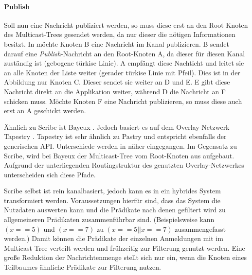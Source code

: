 \paragraph{Publish}
Soll nun eine Nachricht publiziert werden, so muss diese erst an den Root-Knoten des Multicast-Trees gesendet werden, da nur dieser die nötigen Informationen besitzt. In  möchte Knoten B eine Nachricht im Kanal publizieren. B sendet darauf eine \emph{Publish}-Nachricht an den Root-Knoten A, da dieser für diesen Kanal zuständig ist (gebogene türkise Linie). A empfängt diese Nachticht und leitet sie an alle Knoten der Liste weiter (gerader türkise Linie mit Pfeil). Dies ist in der Abbildung nur Knoten C. Dieser sendet sie weiter an D und E. E gibt diese Nachricht direkt an die Applikation weiter, während D die Nachricht an F schicken muss. Möchte Knoten F eine Nachricht publizieren, so muss diese auch erst an A geschickt werden.

Ähnlich zu Scribe ist Bayeux \cite{Zhuang2001}. Jedoch basiert es auf dem Overlay-Netzwerk Tapestry \cite{Zhao2004Tapestry}. Tapestry ist sehr ähnlich zu Pastry und entspricht ebenfalls der generischen API. Unterschiede werden in  näher eingegangen. Im Gegensatz zu Scribe, wird bei Bayeux der Multicast-Tree vom Root-Knoten aus aufgebaut. Aufgrund der unterliegenden Routingstruktur des genutzten Overlay-Netzwerkes unterscheiden sich diese Pfade.

Scribe selbst ist rein kanalbasiert, jedoch kann es in ein hybrides System transformiert werden. Voraussetzungen hierfür sind, dass das System die Nutzdaten auswerten kann und die Prädikate nach denen gefiltert wird zu allgemeineren Prädikaten zusammenführbar sind. (Beispielsweise kann $(x == 5)$ und $(x == 7)$ zu $(x == 5 || x == 7)$ zusammengefasst werden.) Damit können die Prädikate der einzelnen Anmeldungen mit im Multicast-Tree verteilt werden und frühzeitig zur Filterung genutzt werden. Eine große Reduktion der Nachrichtenmenge stellt sich nur ein, wenn die Knoten eines Teilbaumes ähnliche Prädikate zur Filterung nutzen.
